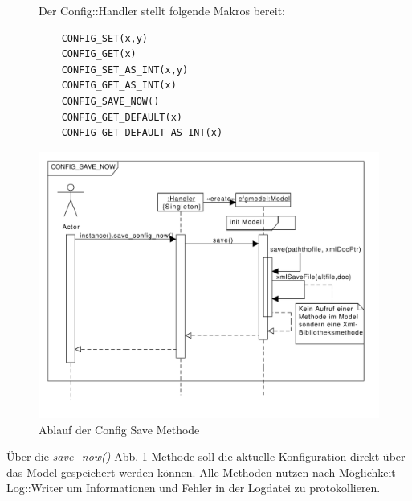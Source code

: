 \begin{figure}[htb!]
    Der Config::Handler stellt folgende Makros bereit:
    \begin{verbatim}
    CONFIG_SET(x,y) 
    CONFIG_GET(x)   
    CONFIG_SET_AS_INT(x,y) 
    CONFIG_GET_AS_INT(x)   
    CONFIG_SAVE_NOW() 
    CONFIG_GET_DEFAULT(x)
    CONFIG_GET_DEFAULT_AS_INT(x)
    \end{verbatim}
\end{figure}

\begin{figure}
    \centering
    \includegraphics[scale=0.5]{./gfx/seq/config_save}
    \caption{Ablauf der Config Save Methode}
    \label{c_configsave}
\end{figure}
Über die \emph{save\_now()} Abb. \ref{c_configsave} Methode soll die aktuelle Konfiguration direkt über das Model gespeichert werden können.
Alle Methoden nutzen nach Möglichkeit Log::Writer um Informationen und Fehler in der Logdatei zu protokollieren.
\newpage
